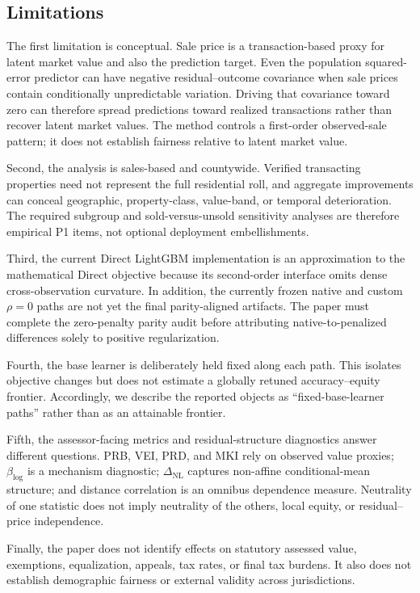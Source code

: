 \documentclass[10pt]{article}
\theoremstyle{definition}
\newcommand{\1}{\mathbf{1}}
\begin{document}
\subsection{Limitations}
The first limitation is conceptual. Sale price is a transaction-based proxy for latent market value and also the prediction target. Even the population squared-error predictor can have negative residual--outcome covariance when sale prices contain conditionally unpredictable variation. Driving that covariance toward zero can therefore spread predictions toward realized transactions rather than recover latent market values. The method controls a first-order observed-sale pattern; it does not establish fairness relative to latent market value.

Second, the analysis is sales-based and countywide. Verified transacting properties need not represent the full residential roll, and aggregate improvements can conceal geographic, property-class, value-band, or temporal deterioration. The required subgroup and sold-versus-unsold sensitivity analyses are therefore empirical P1 items, not optional deployment embellishments.

Third, the current Direct LightGBM implementation is an approximation to the mathematical Direct objective because its second-order interface omits dense cross-observation curvature. In addition, the currently frozen native and custom $\rho=0$ paths are not yet the final parity-aligned artifacts. The paper must complete the zero-penalty parity audit before attributing native-to-penalized differences solely to positive regularization.

Fourth, the base learner is deliberately held fixed along each path. This isolates objective changes but does not estimate a globally retuned accuracy--equity frontier. Accordingly, we describe the reported objects as ``fixed-base-learner paths'' rather than as an attainable frontier.

Fifth, the assessor-facing metrics and residual-structure diagnostics answer different questions. PRB, VEI, PRD, and MKI rely on observed value proxies; $\beta_{\log}$ is a mechanism diagnostic; $\Delta_{\mathrm{NL}}$ captures non-affine conditional-mean structure; and distance correlation is an omnibus dependence measure. Neutrality of one statistic does not imply neutrality of the others, local equity, or residual--price independence.

Finally, the paper does not identify effects on statutory assessed value, exemptions, equalization, appeals, tax rates, or final tax burdens. It also does not establish demographic fairness or external validity across jurisdictions.
\end{document}
